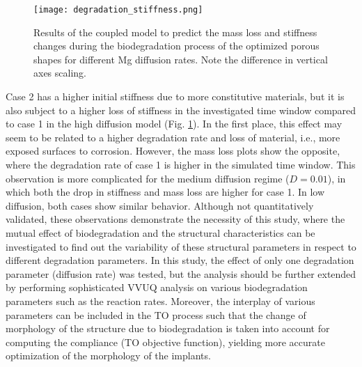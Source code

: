 \begin{figure}[h]
\centering
\medskip
\texttt{[image: degradation\_stiffness.png]}
\caption[Results of the coupled model to predict the stiffness changes during biodegradation]{Results of the coupled model to predict the mass loss and stiffness changes during the biodegradation process of the optimized porous shapes for different Mg diffusion rates. Note the difference in vertical axes scaling.} \label{fig:infill_degradation_stiffness}
\end{figure}


Case 2 has a higher initial stiffness due to more constitutive materials, but it is also subject to a higher loss of stiffness in the investigated time window compared to case 1 in the high diffusion model (Fig. \ref{fig:infill_degradation_stiffness}). In the first place, this effect may seem to be related to a higher degradation rate and loss of material, i.e., more exposed surfaces to corrosion. However, the mass loss plots show the opposite, where the degradation rate of case 1 is higher in the simulated time window. This observation is more complicated for the medium diffusion regime ($D=0.01$), in which both the drop in stiffness and mass loss are higher for case 1. In low diffusion, both cases show similar behavior. Although not quantitatively validated, these observations demonstrate the necessity of this study, where the mutual effect of biodegradation and the structural characteristics can be investigated to find out the variability of these structural parameters in respect to different degradation parameters. In this study, the effect of only one degradation parameter (diffusion rate) was tested, but the analysis should be further extended by performing sophisticated \gls{VVUQ} analysis on various biodegradation parameters such as the reaction rates. Moreover, the interplay of various parameters can be included in the \gls{TO} process such that the change of morphology of the structure due to biodegradation is taken into account for computing the compliance (\gls{TO} objective function), yielding more accurate optimization of the morphology of the implants.

